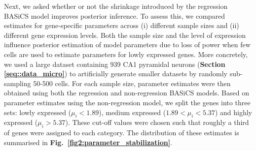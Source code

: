 Next, we asked whether or not the shrinkage introduced by the regression BASiCS model improves posterior inference. 
To assess this, we compared estimates for gene-specific parameters across (i) different sample sizes and (ii) different gene expression levels. 
Both the sample size and the level of expression influence posterior estimation of model parameters due to loss of power when few cells are used to estimate parameters for lowly expressed genes. 
More concretely, we used a large dataset containing 939 CA1 pyramidal neurons \citep{Zeisel2015} (\textbf{Section \ref{seq::data_micro}}) to artificially generate smaller datasets by randomly sub-sampling 50-500 cells. 
For each sample size, parameter estimates were then obtained using both the regression and non-regression BASiCS models. 
Based on parameter estimates using the non-regression model, we split the genes into three sets: lowly expressed ($\mu_i<1.89$), medium expressed ($1.89<\mu_i<5.37$) and highly expressed ($\mu_i>5.37$). 
These cut-off values were chosen such that roughly a third of genes were assigned to each category. 
The distribution of these estimates is summarised in \textbf{Fig.~\ref{fig2:parameter_stabilization}}. \\

